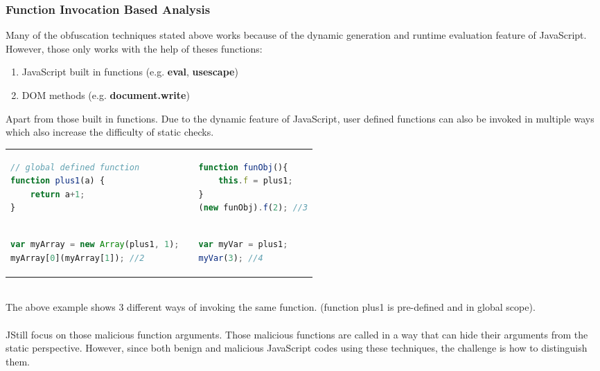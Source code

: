 \documentclass[11pt]{article}
\begin{document}
\subsubsection{Function Invocation Based Analysis} 
Many of the obfuscation techniques stated above works because of the dynamic generation and runtime evaluation feature of JavaScript. However, those only works with the help of theses functions:
\begin{enumerate}
	\item JavaScript built in functions (e.g. \textbf{eval}, \textbf{usescape})
	\item DOM methods (e.g. \textbf{document.write})
\end{enumerate}
Apart from those built in functions. Due to the dynamic feature of JavaScript, user defined functions can also be invoked in multiple ways which also increase the difficulty of static checks. \\
	\begin{tabular}{p{7cm}p{0.5cm}p{7cm}}
			\begin{lstlisting}[language=JavaScript, title=(function plus1)]
// global defined function
function plus1(a) {
	return a+1;
}
			\end{lstlisting} & & \begin{lstlisting}[language=JavaScript, title=(passed as array element)]
function funObj(){
	this.f = plus1;
}
(new funObj).f(2); //3
			\end{lstlisting} \\ 
			\begin{lstlisting}[language=JavaScript, title=(passed as object field)]
var myArray = new Array(plus1, 1);
myArray[0](myArray[1]); //2
			\end{lstlisting}  & & \begin{lstlisting}[language=JavaScript, title=(passed as variable)]
var myVar = plus1;
myVar(3); //4
			\end{lstlisting} 
	\end{tabular}  
\\
The above example shows 3 different ways of invoking the same function. (function plus1 is pre-defined and in global scope). \\ \\
JStill\cite{JStill} focus on those malicious function arguments. Those malicious functions are called in a way that can hide their arguments from the static perspective. However, since both benign and malicious JavaScript codes using these techniques, the challenge is how to distinguish them. 
\end{document}
